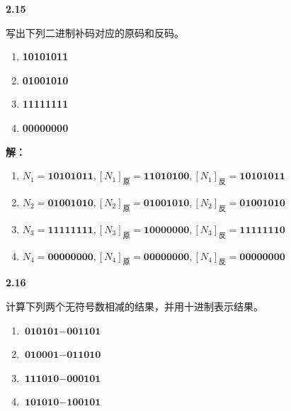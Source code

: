 \documentclass[10pt, a4paper]{article}
\newcommand{\question}[2]{
    \vspace{2ex}\noindent\textbf{#1}\ {\kaishu #2} \par\vspace{1ex}
}
\newcommand{\solution}[1]{
    \noindent\textbf{解：}{\songti #1} \par\vspace{3ex}
}
\begin{document}
\question{2.15}{
写出下列二进制补码对应的原码和反码。
\begin{enumerate}
    \item \textbf{10101011}
    \item \textbf{01001010}
    \item \textbf{11111111}
    \item \textbf{00000000}
\end{enumerate}
}

\solution{
\begin{enumerate}
    \item $ N_1 = \textbf{10101011}, [N_1]_{\text{原}} = \textbf{11010100}, [N_1]_{\text{反}} = \textbf{10101011} $
    \item $ N_2 = \textbf{01001010}, [N_2]_{\text{原}} = \textbf{01001010}, [N_2]_{\text{反}} = \textbf{01001010} $
    \item $ N_3 = \textbf{11111111}, [N_3]_{\text{原}} = \textbf{10000000}, [N_3]_{\text{反}} = \textbf{11111110} $
    \item $ N_4 = \textbf{00000000}, [N_4]_{\text{原}} = \textbf{00000000}, [N_4]_{\text{反}} = \textbf{00000000} $
\end{enumerate}
}

\question{2.16}{
计算下列两个无符号数相减的结果，并用十进制表示结果。
\begin{enumerate}
    \item $ \textbf{010101} - \textbf{001101} $
    \item $ \textbf{010001} - \textbf{011010} $
    \item $ \textbf{111010} - \textbf{000101} $
    \item $ \textbf{101010} - \textbf{100101} $
\end{enumerate}
}
\end{document}
